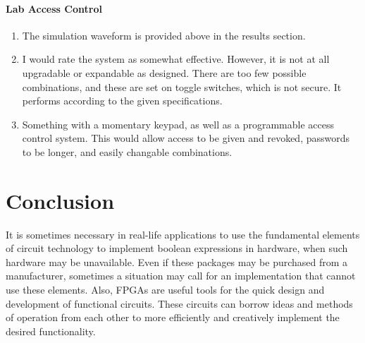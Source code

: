 \documentclass{article}
\begin{document}
    \paragraph{Lab Access Control}

    \begin{enumerate}
            \item The simulation waveform is provided above in the results section.

            \item I would rate the system as somewhat effective. However, it is not at all upgradable or expandable as designed.
                There are too few possible combinations, and these are set on toggle switches, which is not
                secure.
                It performs according to the given specifications.

            \item Something with a momentary keypad, as well as a programmable access control system.
                This would allow access to be given and revoked, passwords to be longer, and easily changable
                combinations.

    \end{enumerate}


    \section{Conclusion}
    It is sometimes necessary in real-life applications to use the fundamental elements
    of circuit technology to implement boolean expressions in hardware, when such
    hardware may be unavailable. Even if these packages may be purchased from a
    manufacturer, sometimes a situation may call for an implementation that cannot
    use these elements.
    Also, FPGAs are useful tools for the quick design and development of functional circuits.
    These circuits can borrow ideas and methods of operation from each other to more
    efficiently and creatively implement the desired functionality.
\end{document}
